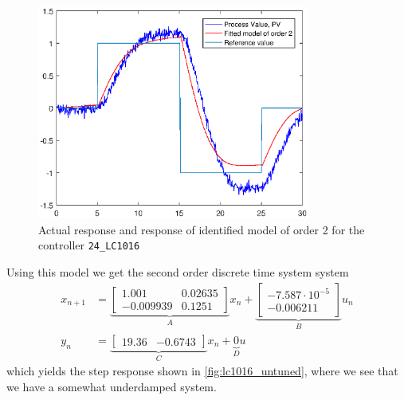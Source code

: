 \begin{figure}[ht!]
	\centering
	\includegraphics[width=0.8\textwidth]{fig/identification/lc1016_order2_ref.eps}
	\caption{Actual response and response of identified model of order 2 for the controller \texttt{24\_LC1016}}
	\label{fig:lc1016_identified}
\end{figure}

Using this model we get the second order discrete time system system
\begin{equation}
	\begin{aligned}
		x_{n+1} &= \underbrace{\begin{bmatrix}
			1.001 & 0.02635 \\ -0.009939 & 0.1251
		\end{bmatrix}}_{A} x_n +
		\underbrace{\begin{bmatrix}
			-7.587\cdot 10^{-5} \\ -0.006211
		\end{bmatrix}}_{B} u_n \\
		y_n &= \underbrace{\begin{bmatrix}
			19.36 & -0.6743
		\end{bmatrix}}_{C} x_n + 
		\underbrace{0}_{D} u
	\end{aligned}
\end{equation}
which yields the step response shown in \autoref{fig:lc1016_untuned}, where we see that we have a somewhat underdamped system.

